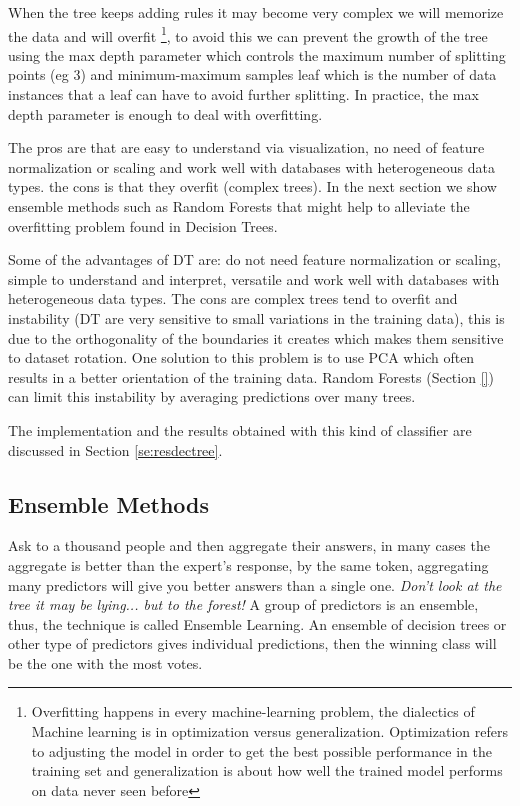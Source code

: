 \documentclass[11pt]{article}
\theoremstyle{definition}
\theoremstyle{remark}
\begin{document}
{%
When the tree keeps adding rules it may become very complex we will memorize the data and will overfit \footnote{Overfitting happens in every machine-learning problem, the dialectics of Machine learning is in optimization versus generalization. Optimization refers to adjusting the model in order to get the best possible performance in the training set and generalization is about how well the trained model performs on data never seen before}, to avoid this we can prevent the growth of the tree using the max depth parameter which controls the maximum number of splitting points (eg 3) and minimum-maximum samples leaf which is the number of data instances that a leaf can have to avoid further splitting. In practice, the max depth parameter is enough to deal with overfitting.

The pros are that are easy to understand via visualization, no need of feature normalization or scaling and work well with databases with heterogeneous data types. the cons is that they overfit (complex trees). In the next section we show ensemble methods such as Random Forests that might help to alleviate the overfitting problem found in Decision Trees.

Some of the advantages of DT are: do not need feature normalization or scaling, simple to understand and interpret, versatile and work well with databases with heterogeneous data types. The cons are complex trees tend to overfit and instability (DT are very sensitive to small variations in the training data), this is due to the orthogonality of the boundaries it creates which makes them sensitive to dataset rotation. One solution to this problem is to use PCA which often results in a better orientation of the training data. Random Forests (Section \ref{}) can limit this instability by averaging predictions over many trees.

The implementation and the results obtained with this kind of classifier are discussed in Section \ref{se:resdectree}.

\subsection{Ensemble Methods}
\label{sse:ensemble}
Ask to a thousand people and then aggregate their answers, in many cases the aggregate is better than the expert's response, by the same token, aggregating many predictors will give you better answers than a single one.
\emph{Don't look at the tree it may be lying... but to the forest!}
A group of predictors is an ensemble, thus, the technique is called Ensemble Learning. An ensemble of decision trees or other type of predictors gives individual predictions, then the winning class will be the one with the most votes. 

}
\end{document}

